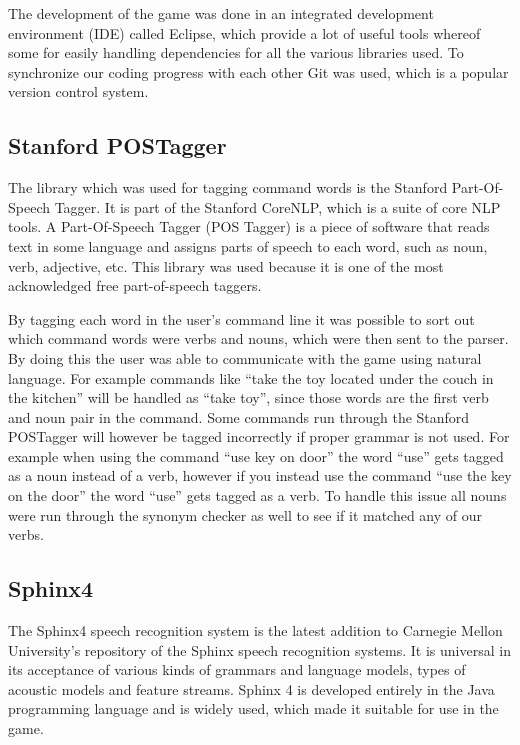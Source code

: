The development of the game was done in an integrated development environment (IDE) called Eclipse, which provide a lot of useful tools whereof some for easily handling dependencies for all the various libraries used. To synchronize our coding progress with each other Git was used, which is a popular version control system.

\subsection{Stanford POSTagger} \label{sec:postagger}
The library which was used for tagging command words is the Stanford Part-Of-Speech Tagger. It is part of the Stanford CoreNLP, which is a suite of core NLP tools. A Part-Of-Speech Tagger (POS Tagger) is a piece of software that reads text in some language and assigns parts of speech to each word, such as noun, verb, adjective, etc. \citep{POSTagger} This library was used because it is one of the most acknowledged free part-of-speech taggers.

By tagging each word in the user's command line it was possible to sort out which command words were verbs and nouns, which were then sent to the parser. By doing this the user was able to communicate with the game using natural language. For example commands like ``take the toy located under the couch in the kitchen'' will be handled as ``take toy'', since those words are the first verb and noun pair in the command. Some commands run through the Stanford POSTagger will however be tagged incorrectly if proper grammar is not used. For example when using the command ``use key on door'' the word ``use'' gets tagged as a noun instead of a verb, however if you instead use the command ``use the key on the door'' the word ``use'' gets tagged as a verb. To handle this issue all nouns were run through the synonym checker as well to see if it matched any of our verbs.

\subsection{Sphinx4} \label{sec:sphinx4}
The Sphinx4 speech recognition system is the latest addition to Carnegie Mellon University's repository of the Sphinx speech recognition systems. It is universal in its acceptance of various kinds of grammars and language models, types of acoustic models and feature streams. Sphinx 4 is developed entirely in the Java programming language and is widely used, which made it suitable for use in the game. \citep{Sphinx4}

